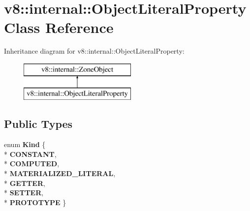 \hypertarget{classv8_1_1internal_1_1_object_literal_property}{}\section{v8\+:\+:internal\+:\+:Object\+Literal\+Property Class Reference}
\label{classv8_1_1internal_1_1_object_literal_property}
Inheritance diagram for v8\+:\+:internal\+:\+:Object\+Literal\+Property\+:\begin{figure}[H]
\begin{center}
\leavevmode
\includegraphics[height=2.000000cm]{classv8_1_1internal_1_1_object_literal_property}
\end{center}
\end{figure}
\subsection*{Public Types}
\begin{DoxyCompactItemize}
\item 
enum {\bfseries Kind} \{ \\*
{\bfseries C\+O\+N\+S\+T\+A\+NT}, 
\\*
{\bfseries C\+O\+M\+P\+U\+T\+ED}, 
\\*
{\bfseries M\+A\+T\+E\+R\+I\+A\+L\+I\+Z\+E\+D\+\_\+\+L\+I\+T\+E\+R\+AL}, 
\\*
{\bfseries G\+E\+T\+T\+ER}, 
\\*
{\bfseries S\+E\+T\+T\+ER}, 
\\*
{\bfseries P\+R\+O\+T\+O\+T\+Y\+PE}
 \}\hypertarget{classv8_1_1internal_1_1_object_literal_property_af9aefcf5ee66734fa346f0f768e45fc1}{}\label{classv8_1_1internal_1_1_object_literal_property_af9aefcf5ee66734fa346f0f768e45fc1}

\end{DoxyCompactItemize}
